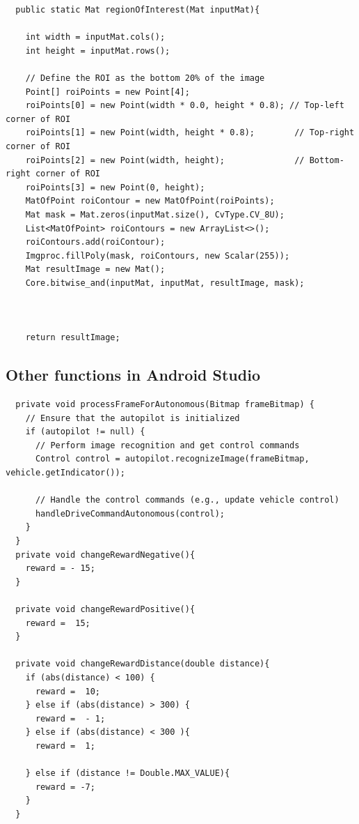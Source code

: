 \documentclass[12pt]{report}
\begin{document}
\begin{lstlisting}
  public static Mat regionOfInterest(Mat inputMat){

    int width = inputMat.cols();
    int height = inputMat.rows();

    // Define the ROI as the bottom 20% of the image
    Point[] roiPoints = new Point[4];
    roiPoints[0] = new Point(width * 0.0, height * 0.8); // Top-left corner of ROI
    roiPoints[1] = new Point(width, height * 0.8);        // Top-right corner of ROI
    roiPoints[2] = new Point(width, height);              // Bottom-right corner of ROI
    roiPoints[3] = new Point(0, height);
    MatOfPoint roiContour = new MatOfPoint(roiPoints);
    Mat mask = Mat.zeros(inputMat.size(), CvType.CV_8U);
    List<MatOfPoint> roiContours = new ArrayList<>();
    roiContours.add(roiContour);
    Imgproc.fillPoly(mask, roiContours, new Scalar(255));
    Mat resultImage = new Mat();
    Core.bitwise_and(inputMat, inputMat, resultImage, mask);



    return resultImage;
\end{lstlisting}

\subsection*{Other functions in Android Studio}
\begin{lstlisting}
  private void processFrameForAutonomous(Bitmap frameBitmap) {
    // Ensure that the autopilot is initialized
    if (autopilot != null) {
      // Perform image recognition and get control commands
      Control control = autopilot.recognizeImage(frameBitmap, vehicle.getIndicator());

      // Handle the control commands (e.g., update vehicle control)
      handleDriveCommandAutonomous(control);
    }
  }
  private void changeRewardNegative(){
    reward = - 15;
  }

  private void changeRewardPositive(){
    reward =  15;
  }

  private void changeRewardDistance(double distance){
    if (abs(distance) < 100) {
      reward =  10;
    } else if (abs(distance) > 300) {
      reward =  - 1;
    } else if (abs(distance) < 300 ){
      reward =  1;

    } else if (distance != Double.MAX_VALUE){
      reward = -7;
    }
  }    
\end{lstlisting}
\end{document}
